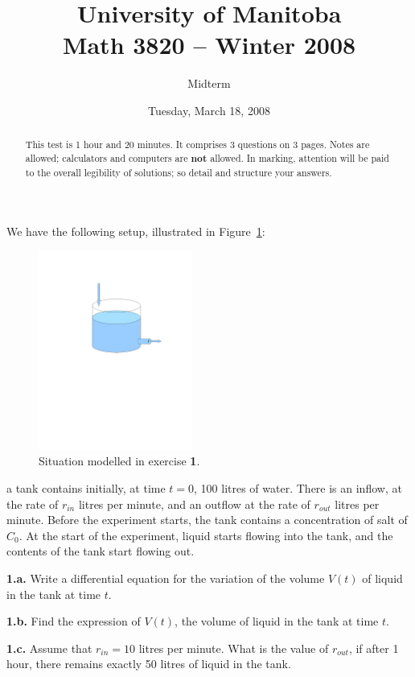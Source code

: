 \documentclass[12pt]{article}
\title{University of Manitoba\\ Math 3820 -- Winter 2008}
\author{Midterm}
\date{Tuesday, March 18, 2008}
\theoremstyle{plain}
\begin{document}
\maketitle
\thispagestyle{empty}
\begin{abstract}
This test is 1 hour and 20 minutes. It comprises 3 questions on 3 pages. Notes are allowed; calculators and computers are \textbf{not} allowed.
In marking, attention will be paid to the overall legibility of solutions; so detail and structure your answers.
\end{abstract}



We have the following setup, illustrated in Figure~\ref{fig:dilution}:
\begin{figure}[htbp]
\begin{center}
\includegraphics[width=0.45\textwidth]{fig1_midterm2007}
\caption{Situation modelled in exercise {\bf 1}.}
\label{fig:dilution}
\end{center}
\end{figure}
a tank contains initially, at time $t=0$, 100 litres of water. There is an inflow, at the rate of $r_{in}$ litres per minute, and an outflow at the rate of $r_{out}$ litres per minute. Before the experiment starts, the tank contains a concentration of salt of $C_0$. At the start of the experiment, liquid starts flowing into the tank, and the contents of the tank start flowing out.

\noindent
{\bf 1.a.}
Write a differential equation for the variation of the volume $V(t)$ of liquid in the tank at time $t$.

\noindent
{\bf 1.b.} 
Find the expression of $V(t)$, the volume of liquid in the tank at time $t$.

\noindent
{\bf 1.c.} Assume that $r_{in}=10$ litres per minute. What is the value of $r_{out}$, if after 1 hour, there remains exactly 50 litres of liquid in the tank.
\end{document}
